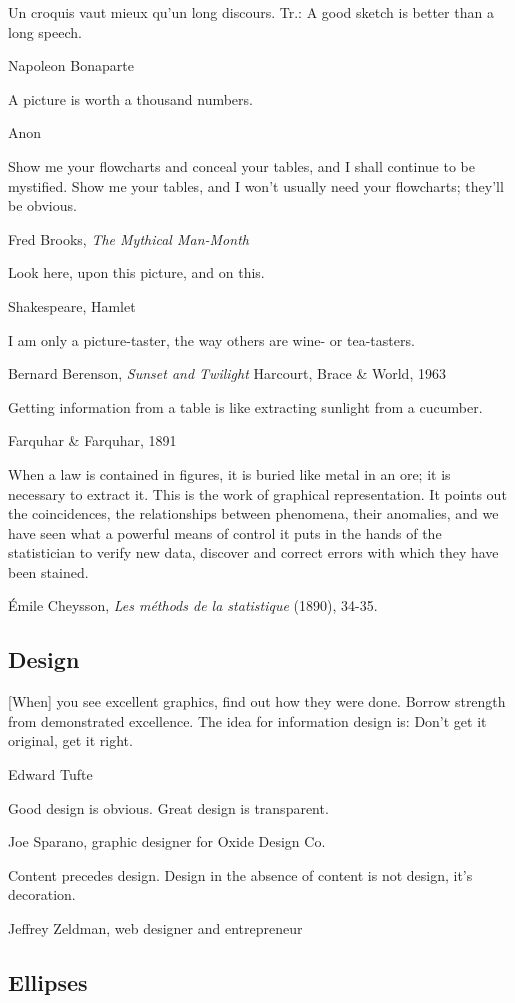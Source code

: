 \epigraph{Un croquis vaut mieux qu'un long discours. Tr.: A good sketch is better than a long speech.}{Napoleon Bonaparte}

\epigraph{A picture is worth a thousand numbers.}{Anon}

\epigraph{Show me your flowcharts and conceal your tables, and I shall continue to be mystified. Show me your tables, and I won't usually need your flowcharts; they'll be obvious.}{Fred Brooks, \emph{The Mythical Man-Month}}

\epigraph{Look here, upon this picture, and on this.}{Shakespeare, Hamlet}


\epigraph{I am only a picture-taster, the way others are wine- or tea-tasters.}{Bernard Berenson, \emph{Sunset and Twilight} Harcourt, Brace \& World, 1963}

\epigraph{Getting information from a table is like extracting sunlight from a cucumber.}{Farquhar \& Farquhar, 1891} %

\epigraph{When a law is contained in figures, it is buried like metal in an ore; it is necessary to extract it.  This is the work of graphical representation. It points out the coincidences, the relationships between phenomena, their anomalies, and we have seen what a powerful means of control it puts in the hands of the statistician to verify new data, discover and correct errors with which they have been stained.}{\'Emile Cheysson, \emph{Les m\'ethods de la statistique} (1890), 34-35.}

\subsection{Design}

\epigraph{[When] you see excellent graphics, find out how they were done. Borrow strength from demonstrated excellence.  The idea for information design is: Don't get it original, get it right.}{Edward Tufte}

\epigraph{Good design is obvious. Great design is transparent.}{Joe Sparano, graphic designer for Oxide Design Co.}

\epigraph{Content precedes design. Design in the absence of content is not design, it's decoration.}{Jeffrey Zeldman, web designer and entrepreneur}

\subsection{Ellipses}

